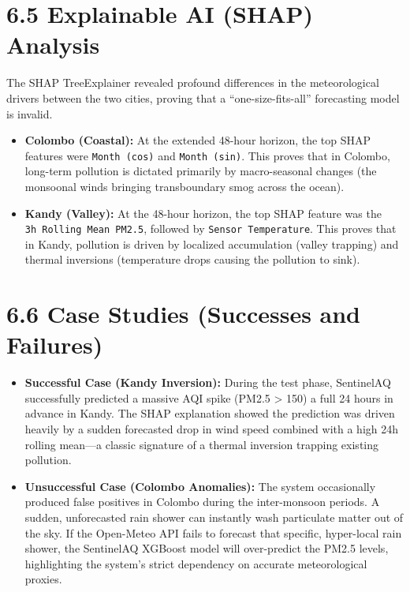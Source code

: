 \section{6.5 Explainable AI (SHAP)
Analysis}\label{explainable-ai-shap-analysis}

The SHAP TreeExplainer revealed profound differences in the
meteorological drivers between the two cities, proving that a
``one-size-fits-all'' forecasting model is invalid.

\begin{itemize}
\tightlist
\item
  \textbf{Colombo (Coastal):} At the extended 48-hour horizon, the top
  SHAP features were \texttt{Month\ (cos)} and \texttt{Month\ (sin)}.
  This proves that in Colombo, long-term pollution is dictated primarily
  by macro-seasonal changes (the monsoonal winds bringing transboundary
  smog across the ocean).
\item
  \textbf{Kandy (Valley):} At the 48-hour horizon, the top SHAP feature
  was the \texttt{3h\ Rolling\ Mean\ PM2.5}, followed by
  \texttt{Sensor\ Temperature}. This proves that in Kandy, pollution is
  driven by localized accumulation (valley trapping) and thermal
  inversions (temperature drops causing the pollution to sink).
\end{itemize}

\section{6.6 Case Studies (Successes and
Failures)}\label{case-studies-successes-and-failures}

\begin{itemize}
\tightlist
\item
  \textbf{Successful Case (Kandy Inversion):} During the test phase,
  SentinelAQ successfully predicted a massive AQI spike (PM2.5
  \textgreater{} 150) a full 24 hours in advance in Kandy. The SHAP
  explanation showed the prediction was driven heavily by a sudden
  forecasted drop in wind speed combined with a high 24h rolling
  mean---a classic signature of a thermal inversion trapping existing
  pollution.
\item
  \textbf{Unsuccessful Case (Colombo Anomalies):} The system
  occasionally produced false positives in Colombo during the
  inter-monsoon periods. A sudden, unforecasted rain shower can
  instantly wash particulate matter out of the sky. If the Open-Meteo
  API fails to forecast that specific, hyper-local rain shower, the
  SentinelAQ XGBoost model will over-predict the PM2.5 levels,
  highlighting the system's strict dependency on accurate meteorological
  proxies.
\end{itemize}
